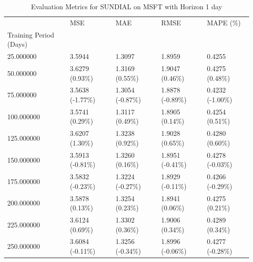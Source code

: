 \begin{table}
\caption{Evaluation Metrics for SUNDIAL on MSFT with Horizon 1 day}
\label{tab:sundial_MSFT_h1_metrics}
\begin{tabular}{lllll}
\toprule
 & MSE & MAE & RMSE & MAPE (\%) \\
Training Period (Days) &  &  &  &  \\
\midrule
25.000000 & 3.5944 & 1.3097 & 1.8959 & 0.4255 \\
50.000000 & 3.6279 (0.93\%) & 1.3169 (0.55\%) & 1.9047 (0.46\%) & 0.4275 (0.48\%) \\
75.000000 & 3.5638 (-1.77\%) & 1.3054 (-0.87\%) & 1.8878 (-0.89\%) & 0.4232 (-1.00\%) \\
100.000000 & 3.5741 (0.29\%) & 1.3117 (0.49\%) & 1.8905 (0.14\%) & 0.4254 (0.51\%) \\
125.000000 & 3.6207 (1.30\%) & 1.3238 (0.92\%) & 1.9028 (0.65\%) & 0.4280 (0.60\%) \\
150.000000 & 3.5913 (-0.81\%) & 1.3260 (0.16\%) & 1.8951 (-0.41\%) & 0.4278 (-0.03\%) \\
175.000000 & 3.5832 (-0.23\%) & 1.3224 (-0.27\%) & 1.8929 (-0.11\%) & 0.4266 (-0.29\%) \\
200.000000 & 3.5878 (0.13\%) & 1.3254 (0.23\%) & 1.8941 (0.06\%) & 0.4275 (0.21\%) \\
225.000000 & 3.6124 (0.69\%) & 1.3302 (0.36\%) & 1.9006 (0.34\%) & 0.4289 (0.34\%) \\
250.000000 & 3.6084 (-0.11\%) & 1.3256 (-0.34\%) & 1.8996 (-0.06\%) & 0.4277 (-0.28\%) \\
\bottomrule
\end{tabular}
\end{table}
